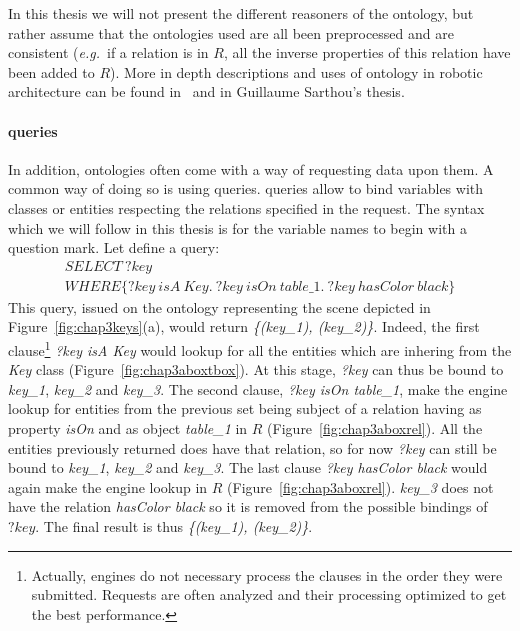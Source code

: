 \documentclass[a4paper,11pt,twoside]{StyleThese}
\begin{document}
In this thesis we will not present the different reasoners of the ontology, but rather assume that the ontologies used are all been preprocessed and are consistent (\textit{e.g.}~if a relation is in $R$, all the inverse properties of this relation have been added to $R$). More in depth descriptions and uses of ontology in robotic architecture can be found in~\cite{sarthou2019ontologenius} and in Guillaume Sarthou's thesis.

\paragraph{\sparql{} queries}
In addition, ontologies often come with a way of requesting data upon them. A common way of doing so is using \sparql{} queries. \sparql{} queries allow to bind variables with classes or entities respecting the relations specified in the request. The syntax which we will follow in this thesis is for the variable names to begin with a question mark. Let define a \sparql{} query: 
\begin{multline*}
SELECT \ ?key\\
WHERE \{?key \ isA \ Key. \ ?key \ isOn \ table\_1. \ ?key \ hasColor \ black\}
\end{multline*}
This query, issued on the ontology representing the scene depicted in Figure~\ref{fig:chap3keys}(a), would return \textit{\{(key\_1), (key\_2)\}}. Indeed, the first clause\footnote{Actually, \sparql{} engines do not necessary process the clauses in the order they were submitted. Requests are often analyzed and their processing optimized to get the best performance.} \textit{?key isA Key} would lookup for all the entities which are inhering from the \textit{Key} class (Figure~\ref{fig:chap3aboxtbox}). At this stage, \textit{?key} can thus be bound to \textit{key\_1}, \textit{key\_2} and \textit{key\_3}. The second clause, \textit{?key isOn table\_1}, make the \sparql{} engine lookup for entities from the previous set being subject of a relation having as property \textit{isOn} and as object \textit{table\_1} in $R$ (Figure~\ref{fig:chap3aboxrel}). All the entities previously returned does have that relation, so for now \textit{?key} can still be bound to \textit{key\_1}, \textit{key\_2} and \textit{key\_3}. The last clause \textit{?key hasColor black} would again make the engine lookup in $R$ (Figure~\ref{fig:chap3aboxrel}). \textit{key\_3} does not have the relation \textit{hasColor black} so it is removed from the possible bindings of $?key$. The final result is thus \textit{\{(key\_1), (key\_2)\}}. 
\end{document}
